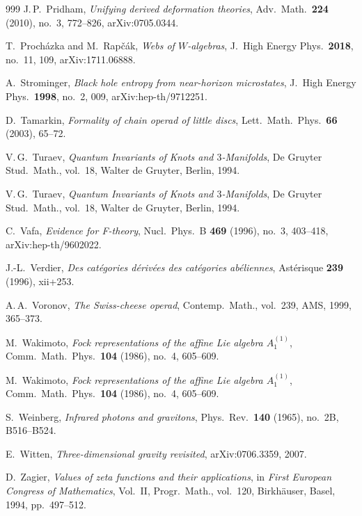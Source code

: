 \documentclass[11pt]{memoir}
\begin{document}
\begin{thebibliography}{999}
J.\,P.~Pridham, \emph{Unifying derived deformation theories}, Adv.\ Math.\ \textbf{224} (2010), no.~3, 772--826, arXiv:0705.0344.

T.~Proch\'azka and M.~Rap\v{c}\'ak, \emph{Webs of $W$-algebras}, J.\ High Energy Phys.\ \textbf{2018}, no.~11, 109, arXiv:1711.06888.

A.~Strominger, \emph{Black hole entropy from near-horizon microstates}, J.\ High Energy Phys.\ \textbf{1998}, no.~2, 009, arXiv:hep-th/9712251.

D.~Tamarkin, \emph{Formality of chain operad of little discs}, Lett.\ Math.\ Phys.\ \textbf{66} (2003), 65--72.

V.\,G.~Turaev, \emph{Quantum Invariants of Knots and $3$-Manifolds}, De Gruyter Stud.\ Math., vol.~18, Walter de Gruyter, Berlin, 1994.

V.\,G.~Turaev, \emph{Quantum Invariants of Knots and $3$-Manifolds}, De Gruyter Stud.\ Math., vol.~18, Walter de Gruyter, Berlin, 1994.

C.~Vafa, \emph{Evidence for F-theory}, Nucl.\ Phys.\ B \textbf{469} (1996), no.~3, 403--418, arXiv:hep-th/9602022.

J.-L.~Verdier, \emph{Des cat\'egories d\'eriv\'ees des cat\'egories ab\'eliennes}, Ast\'erisque \textbf{239} (1996), xii+253.

A.\,A.~Voronov, \emph{The Swiss-cheese operad}, Contemp.\ Math., vol.~239, AMS, 1999, 365--373.

M.~Wakimoto, \emph{Fock representations of the affine Lie algebra $A_1^{(1)}$}, Comm.\ Math.\ Phys.\ \textbf{104} (1986), no.~4, 605--609.

M.~Wakimoto, \emph{Fock representations of the affine Lie algebra $A_1^{(1)}$}, Comm.\ Math.\ Phys.\ \textbf{104} (1986), no.~4, 605--609.

S.~Weinberg, \emph{Infrared photons and gravitons}, Phys.\ Rev.\ \textbf{140} (1965), no.~2B, B516--B524.

E.~Witten, \emph{Three-dimensional gravity revisited}, arXiv:0706.3359, 2007.

D.~Zagier, \emph{Values of zeta functions and their applications}, in \emph{First European Congress of Mathematics}, Vol.~II, Progr.\ Math., vol.~120, Birkh\"auser, Basel, 1994, pp.~497--512.


\end{thebibliography}
\end{document}
